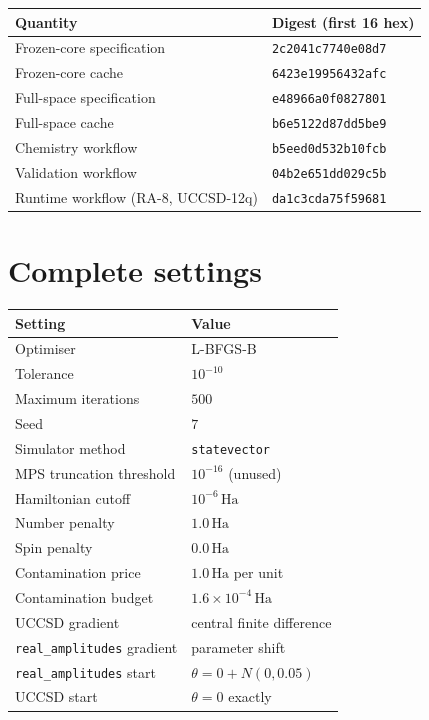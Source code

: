 \documentclass[11pt,a4paper]{article}
\newcommand{\Ha}{\ensuremath{\,\mathrm{Ha}}}
\newcommand{\code}[1]{\texttt{\small #1}}
\begin{document}
\begin{center}
\small
\begin{tabular}{ll}
\toprule
Quantity & Digest (first 16 hex) \\
\midrule
Frozen-core specification  & \code{2c2041c7740e08d7} \\
Frozen-core cache          & \code{6423e19956432afc} \\
Full-space specification   & \code{e48966a0f0827801} \\
Full-space cache           & \code{b6e5122d87dd5be9} \\
Chemistry workflow         & \code{b5eed0d532b10fcb} \\
Validation workflow        & \code{04b2e651dd029c5b} \\
Runtime workflow (RA-8, UCCSD-12q) & \code{da1c3cda75f59681} \\
\bottomrule
\end{tabular}
\end{center}

\section{Complete settings}

\begin{center}
\small
\begin{tabular}{ll}
\toprule
Setting & Value \\
\midrule
Optimiser                    & L-BFGS-B \\
Tolerance                    & $10^{-10}$ \\
Maximum iterations           & $500$ \\
Seed                         & $7$ \\
Simulator method             & \code{statevector} \\
MPS truncation threshold     & $10^{-16}$ (unused) \\
Hamiltonian cutoff           & $10^{-6}\Ha$ \\
Number penalty               & $1.0\Ha$ \\
Spin penalty                 & $0.0\Ha$ \\
Contamination price          & $1.0\Ha$ per unit \\
Contamination budget         & $1.6\times10^{-4}\Ha$ \\
UCCSD gradient               & central finite difference \\
\code{real\_amplitudes} gradient & parameter shift \\
\code{real\_amplitudes} start    & $\theta=0 + N(0,0.05)$ \\
UCCSD start                  & $\theta = 0$ exactly \\
\bottomrule
\end{tabular}
\end{center}
\end{document}
